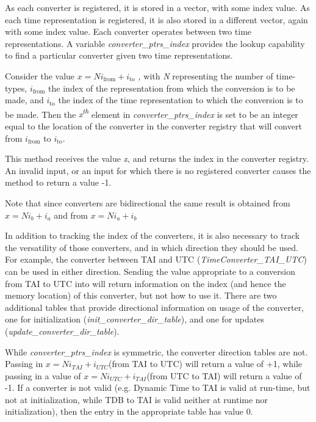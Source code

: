 {\begin{enumerate}
{\begin{enumerate}
\label{ref:getconvptrindex}As each converter is registered, it is stored
in a vector, with some index value.  As each time representation is
registered, it is also stored in a different vector, again with some
index value.  Each converter operates between two time representations.
 A variable \textit{converter\_ptrs\_index }provides the lookup
capability to find a particular converter given two time
representations.




Consider the value  $x=Ni_{\text{from}}+i_{\text{to}}$\textit{ , }with
\textit{N}
representing the number of time-types,  $i_{\text{from}}$ the index of
the representation from which the conversion is to be made, and
$i_{\text{to}}$ the index of the time representation to which the
conversion is to be made.  Then the
\textit{x}\textit{\textsuperscript{th}}\textit{ }element in
\textit{converter\_ptrs\_index }is set to be  an integer equal to the
location of the converter in the converter registry that will convert
from $i_{\text{from}}$ to  $i_{\text{to}}$.




This method receives the value \textit{x}, and returns the index in the
converter registry.  An invalid input, or an input for which there is
no registered converter causes the method to return a value -1.




Note that since converters are bidirectional the same result is
obtained from  $x=Ni_{b}+i_{a}$ and from   $x=Ni_{a}+i_{b}$

\label{ref:getconvdirinit}In addition to tracking the index of the
converters, it is also necessary to track the versatility of those
converters, and in which direction they should be used.  For example,
the converter between TAI and UTC (\textit{TimeConverter\_TAI\_UTC})
can be used in either direction.  Sending the value appropriate to a
conversion from TAI to UTC into
 will return information on the index (and hence the memory location)
 of this converter, but not how to use it.  There are two
additional tables that provide directional information on usage of the
converter, one for initialization
(\textit{init\_converter\_dir\_table}), and one for updates
(\textit{update\_converter\_dir\_table}).




While \textit{converter\_ptrs\_index }is symmetric,\textit{ }the
converter direction tables are not.  Passing in
$x=Ni_{\mathit{TAI}}+i_{\mathit{UTC}}$(from TAI to UTC) will return a
value of +1, while passing in a value of
$x=Ni_{\mathit{UTC}}+i_{\mathit{TAI}}$(from UTC to TAI) will return a
value of -1.  If a converter is not valid (e.g. Dynamic Time to TAI is
valid at run-time, but not at initialization, while TDB to TAI is valid
neither at runtime nor initialization), then the entry in the
appropriate table has value 0.





\end{enumerate}}
\end{enumerate}}
